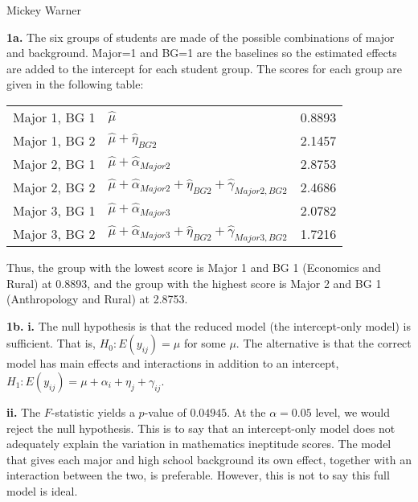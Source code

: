 \documentclass[12pt]{article}
\begin{document}
\noindent Mickey Warner
\bigskip

\noindent \textbf{1a.} The six groups of students are made of the possible combinations of major and background. Major=1 and BG=1 are the baselines so the estimated effects are added to the intercept for each student group. The scores for each group are given in the following table:

\begin{table}[h]
\begin{center}
\begin{tabular}{l|lr}
\hline \hline
Major 1, BG 1 & $\hat{\mu}$                                             & 0.8893 \\
Major 1, BG 2 & $\hat{\mu} + \hat{\eta}_{BG2}$                          & 2.1457 \\
Major 2, BG 1 & $\hat{\mu} + \hat{\alpha}_{Major2}$                     & 2.8753 \\
Major 2, BG 2 & $\hat{\mu} + \hat{\alpha}_{Major2} + \hat{\eta}_{BG2} + \hat{\gamma}_{Major2,BG2}$  & 2.4686 \\
Major 3, BG 1 & $\hat{\mu} + \hat{\alpha}_{Major3}$                     & 2.0782 \\
Major 3, BG 2 & $\hat{\mu} + \hat{\alpha}_{Major3} + \hat{\eta}_{BG2} + \hat{\gamma}_{Major3,BG2}$  & 1.7216 \\
\hline \hline
\end{tabular}
\end{center}
\end{table}
\noindent Thus, the group with the lowest score is Major 1 and BG 1 (Economics and Rural) at 0.8893, and the group with the highest score is Major 2 and BG 1 (Anthropology and Rural) at 2.8753.
\bigskip

\noindent \textbf{1b.} \textbf{i.} The null hypothesis is that the reduced model (the intercept-only model) is sufficient. That is, $H_0: E(y_{ij})=\mu$ for some $\mu$. The alternative is that the correct model has main effects and interactions in addition to an intercept, $H_1: E(y_{ij})=\mu+\alpha_i+\eta_j+\gamma_{ij}$.
\bigskip

\noindent \textbf{ii.} The $F$-statistic yields a $p$-value of $0.04945$. At the $\alpha=0.05$ level, we would reject the null hypothesis. This is to say that an intercept-only model does not adequately explain the variation in mathematics ineptitude scores. The model that gives each major and high school background its own effect, together with an interaction between the two, is preferable. However, this is not to say this full model is ideal.
\bigskip
\end{document}
